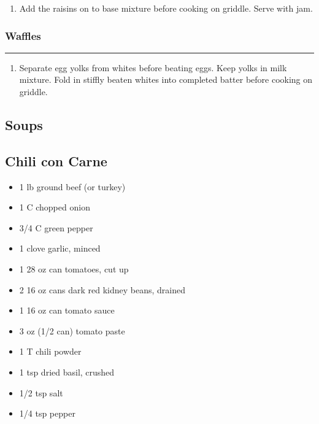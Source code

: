 \documentclass{article}
\begin{document}
\begin{enumerate}
    \item 
        Add the raisins on to base mixture before cooking on griddle. Serve with jam.
\end{enumerate}

\subsubsection{Waffles} 
\noindent\rule[0.5ex]{\linewidth}{0.5pt}

\begin{enumerate}
    \item 
        Separate egg yolks from whites before beating eggs. Keep yolks in milk mixture. Fold in stiffly beaten whites into completed batter before cooking on griddle.
\end{enumerate}
\newpage

\vspace*{\fill}
\begin{center}
    \section{Soups}
\end{center}
\vspace*{\fill}
\newpage

\subsection{Chili con Carne} 

\begin{framed}
    \begin{itemize}
        \item 1 lb ground beef (or turkey)
        \item 1 C chopped onion
        \item 3/4 C green pepper
        \item 1 clove garlic, minced
        \item 1 28 oz can tomatoes, cut up
        \item 2 16 oz cans dark red kidney beans, drained
        \item 1 16 oz can tomato sauce
        \item 3 oz (1/2 can) tomato paste
        \item 1 T chili powder
        \item 1 tsp dried basil, crushed
        \item 1/2 tsp salt
        \item 1/4 tsp pepper
    \end{itemize}
\end{framed}
\end{document}
